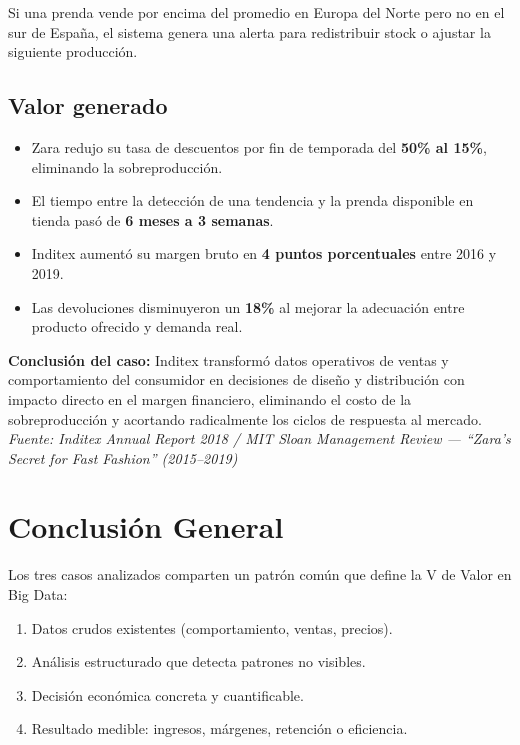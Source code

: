 \documentclass[12pt, a4paper]{article}
\begin{document}
Si una prenda vende por encima del promedio en Europa del Norte pero no en el sur de España, el sistema genera una alerta para redistribuir stock o ajustar la siguiente producción.

\subsection{Valor generado}

\begin{itemize}[leftmargin=1.5cm]
  \item Zara redujo su tasa de descuentos por fin de temporada del \textbf{50\% al 15\%}, eliminando la sobreproducción.
  \item El tiempo entre la detección de una tendencia y la prenda disponible en tienda pasó de \textbf{6 meses a 3 semanas}.
  \item Inditex aumentó su margen bruto en \textbf{4 puntos porcentuales} entre 2016 y 2019.
  \item Las devoluciones disminuyeron un \textbf{18\%} al mejorar la adecuación entre producto ofrecido y demanda real.
\end{itemize}

\begin{conclusionbox}
\textbf{Conclusión del caso:} Inditex transformó datos operativos de ventas y comportamiento del consumidor en decisiones de diseño y distribución con impacto directo en el margen financiero, eliminando el costo de la sobreproducción y acortando radicalmente los ciclos de respuesta al mercado.\\[4pt]
\textit{\small Fuente: Inditex Annual Report 2018 / MIT Sloan Management Review --- ``Zara's Secret for Fast Fashion'' (2015--2019)}
\end{conclusionbox}


\section{Conclusión General}

Los tres casos analizados comparten un patrón común que define la V de Valor en Big Data:

\begin{enumerate}[leftmargin=1.5cm]
  \item Datos crudos existentes (comportamiento, ventas, precios).
  \item Análisis estructurado que detecta patrones no visibles.
  \item Decisión económica concreta y cuantificable.
  \item Resultado medible: ingresos, márgenes, retención o eficiencia.
\end{enumerate}
\end{document}
